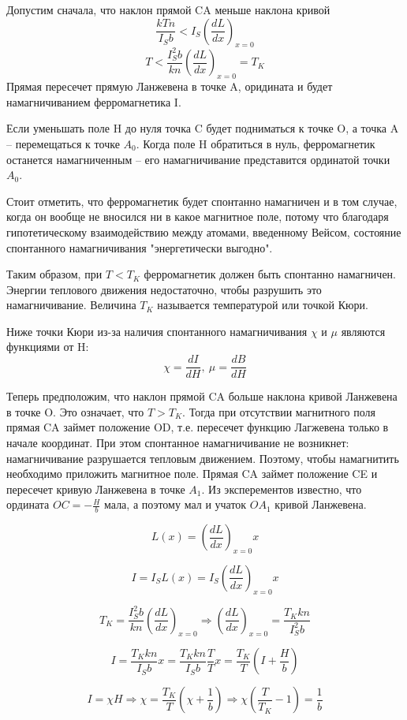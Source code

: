 \documentclass[a4paper,14pt]{article} %
\begin{document}
Допустим сначала, что наклон прямой CA меньше наклона кривой
\[\frac{kTn}{I_Sb} < I_S\left(\frac{dL}{dx}\right)_{x=0}\]
\[T < \frac{I_S^2 b}{kn}\left(\frac{dL}{dx}\right)_{x=0} = T_K\]
Прямая пересечет прямую Ланжевена в точке A, оридината и будет намагничиванием ферромагнетика I.

Если уменьшать поле H до нуля точка C будет подниматься к точке O, а точка A -- перемещаться к точке $A_0$. Когда поле H обратиться в нуль, ферромагнетик останется намагниченным -- его намагничивание представится ординатой точки $A_0$. 

Стоит отметить, что ферромагнетик будет спонтанно намагничен и в том случае, когда он вообще не вносился ни в какое магнитное поле, потому что благодаря гипотетическому взаимодействию между атомами, введенному Вейсом, состояние спонтанного намагничивания "энергетически выгодно".

Таким образом, при $T < T_K$ ферромагнетик должен быть спонтанно намагничен. Энергии теплового движения недостаточно, чтобы разрушить это намагничивание. Величина $T_K$ называется температурой или точкой Кюри.

Ниже точки Кюри из-за наличия спонтанного намагничивания $\chi$ и $\mu$ являются функциями от H:
\[\chi = \frac{dI}{dH},~ \mu = \frac{dB}{dH}\]

Теперь предположим, что наклон прямой CA больше наклона кривой Ланжевена в точке O. Это означает, что $T > T_K$. Тогда при отсутствии магнитного поля прямая CA займет положение OD, т.е. пересечет функцию Лагжевена только в начале координат. При этом спонтанное намагничивание не возникнет: намагничивание разрушается тепловым движением. Поэтому, чтобы намагнитить необходимо приложить магнитное поле. Прямая CA займет положение CE и пересечет кривую Ланжевена в точке $A_1$. Из эксперементов известно, что ордината $OC = -\frac{H}{b}$ мала, а поэтому мал и учаток $OA_1$ кривой Ланжевена.

\[L(x) = \left(\frac{dL}{dx}\right)_{x=0}x\]

\[I = I_S L(x) = I_S \left(\frac{dL}{dx}\right)_{x=0}x\]

\[T_K = \frac{I_S^2 b}{kn}\left(\frac{dL}{dx}\right)_{x=0} \Rightarrow \left(\frac{dL}{dx}\right)_{x=0} = \frac{T_K k n}{I_S^2b}\]

\[I = \frac{T_K k n}{I_Sb} x = \frac{T_K k n}{I_Sb} \frac{T}{T}x = \frac{T_K}{T}\left(I + \frac{H}{b}\right)\]

\[I = \chi H \Rightarrow \chi = \frac{T_K}{T}\left(\chi + \frac{1}{b}\right) \Rightarrow \chi\left(\frac{T}{T_K} - 1\right) = \frac{1}{b}\]
\end{document}
